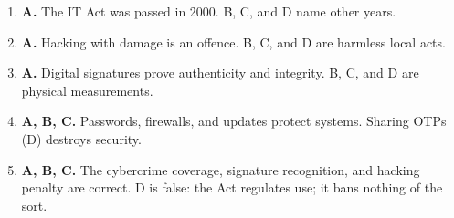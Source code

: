 \documentclass[11pt]{article}
\begin{document}
\begin{enumerate}[label=\textbf{Q\arabic*.}, leftmargin=*]
\item \textbf{A.} The IT Act was passed in 2000. B, C, and D name other years.
\item \textbf{A.} Hacking with damage is an offence. B, C, and D are harmless local acts.
\item \textbf{A.} Digital signatures prove authenticity and integrity. B, C, and D are physical measurements.
\item \textbf{A, B, C.} Passwords, firewalls, and updates protect systems. Sharing OTPs (D) destroys security.
\item \textbf{A, B, C.} The cybercrime coverage, signature recognition, and hacking penalty are correct. D is false: the Act regulates use; it bans nothing of the sort.
\end{enumerate}
\def\JKSSBLessonID{56}\def\JKSSBAnswers{1}
\end{document}
